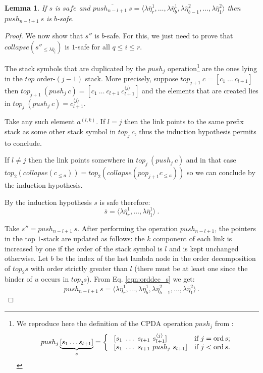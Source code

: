 \documentclass{article}
\newcommand{\ord}{\mathop{\mathrm{ord}}}
\newcommand{\prefixof}{\leqslant}
\newtheorem{lemma}{Lemma}[section]
\theoremstyle{remark}
\theoremstyle{definition}
\newcommand\orddec\overline
\begin{document}
\begin{lemma}
  \label{lem:pushj_safe_implies_b-safe}
If $s$ is $safe$ and $\orddec{push_{n-l+1}\ s} = \langle \lambda
\overline{\eta}_r^1 , \ldots,  \lambda \overline{\eta}_{b}^1,
\lambda \overline{\eta}_{b-1}^2, \ldots,
 \lambda \overline{\eta}_1^2 \rangle$
then $push_{n-l+1}\ s$ is $b$-safe.
\end{lemma}
\begin{proof}
\hrulefill

 We now show that $s''$ is $b$-safe. For this, we just need to
prove that $collapse(s''_{\prefixof \lambda \overline{\eta}_{i}})$
is $1$-safe for all $q \leq i \leq r$.

The stack symbols that are duplicated by the $push_j$
operation\footnote{We reproduce here the definition of the CPDA
operation $push_j$ from \cite{hague-sto07}:
$$ push_j \underbrace{[ s_1 \ldots s_{l+1} ]}_{s} =
\left\{
  \begin{array}{ll}
\    [s_1\ \ldots\ s_{l+1}\ s_{l+1}^{\langle j \rangle}]  &\hbox{if $j = \ord{s}$;}\\
\    [s_1\ \ldots\ s_{l+1}\ push_j\ s_{l+1}]  &\hbox{if $j<\ord{s}$.}
 \end{array}
\right.
$$} are the ones lying in the $top$
order-$(j-1)$ stack. More precisely, suppose $top_{j+1}\ c = [c_1\
\ldots\ c_{l+1}]$ then $top_{j+1}\ (push_j\ c) = [c_1\ \ldots\
c_{l+1}\ c_{l+1}^{\langle j \rangle}]$ and the elements that are
created lies in $top_j\ (push_j\ c) = c_{l+1}^{\langle j \rangle}$.

Take any such element $a^{(l,k)}$. If $l=j$ then the link points to
the same prefix stack as some other stack symbol in $top_j\ c$, thus
the induction hypothesis permits to conclude.

If $l \neq j$ then the link points somewhere in $top_j\ (push_j\ c)$
and in that case $top_2( collapse(c_{\prefixof{a}})) = top_2(
collapse( pop_{j+1} c_{\prefixof{a}}))$ so we can conclude by the
induction hypothesis.



\hrulefill


By the induction hypothesis $s$ is safe therefore:
\begin{equation}
 \orddec{s} = \langle \lambda \overline{\eta}_r^1
, \ldots, \lambda \overline{\eta}_1^1   \rangle \ . \label{eqn:orddec_s}
\end{equation}

Take $s'' = push_{n-l+1}\ s$. After performing the operation
$push_{n-l+1}$, the pointers in the top $1$-stack are updated as
follows: the $k$ component of each link is increased by one if
the order of the stack symbol is $l$ and is kept unchanged
otherwise. Let $b$ be the index of the last lambda node in the
order decomposition of $top_2 s$ with order strictly greater
than $l$ (there must be at least one since the binder of $u$
occurs in $top_2 s$). From Eq. \ref{eqn:orddec_s} we get:
\begin{equation}
\orddec{push_{n-l+1}\ s} = \langle
\lambda \overline{\eta}_r^1
, \ldots,  \lambda \overline{\eta}_{b}^1, \lambda \overline{\eta}_{b-1}^2, \ldots,
 \lambda \overline{\eta}_1^2 \rangle
\ . \label{eqn:orddec_pushj_s}
\end{equation}



\end{proof}
\end{document}
